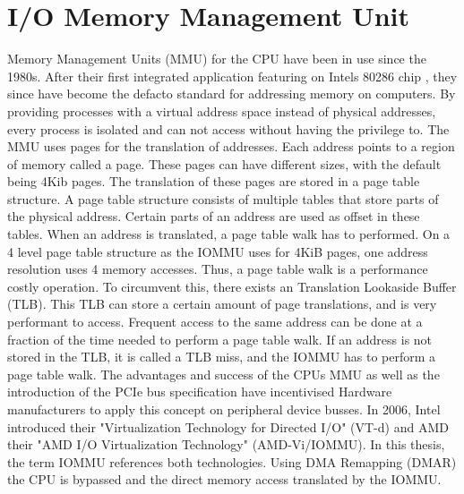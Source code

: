 \section{I/O Memory Management Unit}
Memory Management Units (MMU) for the CPU have been in use since the 1980s. After their first integrated application featuring on Intels 80286 chip \cite{intel80286}, they since have become the defacto standard for addressing memory on computers. By providing processes with a virtual address space instead of physical addresses, every process is isolated and can not access without having the privilege to. The MMU uses pages for the translation of addresses. Each address points to a region of memory called a page. These pages can have different sizes, with the default being 4Kib pages.
The translation of these pages are stored in a page table structure. A page table structure consists of multiple tables that store parts of the physical address. Certain parts of an address are used as offset in these tables. When an address is translated, a page table walk has to performed. On a 4 level page table structure as the IOMMU uses for 4KiB pages, one address resolution uses 4 memory accesses. Thus, a page table walk is a performance costly operation. To circumvent this, there exists an Translation Lookaside Buffer (TLB). This TLB can store a certain amount of page translations, and is very performant to access. Frequent access to the same address can be done at a fraction of the time needed to perform a page table walk. If an address is not stored in the TLB, it is called a TLB miss, and the IOMMU has to perform a page table walk.
The advantages and success of the CPUs MMU as well as the introduction of the PCIe bus specification have incentivised Hardware manufacturers to apply this concept on peripheral device busses. In 2006, Intel introduced their "Virtualization Technology for Directed I/O" (VT-d) and AMD their "AMD I/O Virtualization Technology" (AMD-Vi/IOMMU). In this thesis, the term IOMMU references both technologies.
Using DMA Remapping (DMAR) the CPU is bypassed and the direct memory access translated by the IOMMU.



